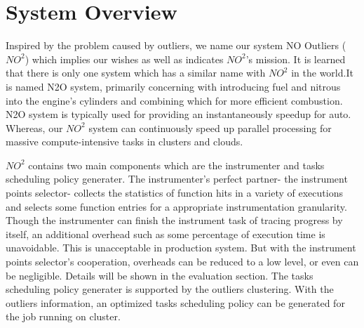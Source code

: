\section{System Overview} \label{sec-overview}

Inspired by the problem caused by outliers, we name our system NO Outliers ($NO^2$) which implies our
wishes as well as indicates $NO^2$'s mission. It is learned that there is only one system which has a
similar name with $NO^2$ in the world.It is named N2O system, primarily concerning with
introducing fuel and nitrous into the engine's cylinders and combining which for more
efficient combustion. N2O system is typically used for providing an instantaneously speedup for auto.
Whereas, our $NO^2$ system can continuously speed up parallel processing for massive
compute-intensive tasks in clusters and clouds.

$NO^2$ contains two main components which are the instrumenter and tasks scheduling policy
generater. The instrumenter's perfect partner- the instrument points selector- 
collects the statistics of function hits in a variety of executions and selects some
function entries for a appropriate instrumentation granularity. Though the instrumenter
can finish the instrument task of tracing progress by itself, an additional overhead such
as some percentage of execution time is unavoidable. This is unacceptable in
production system. But with the instrument points selector's cooperation, overheads can be
reduced to a low level, or even can be negligible. Details will be shown in the evaluation section. The
tasks scheduling policy generater is supported by the outliers clustering. With the
outliers information, an optimized tasks scheduling policy can be generated for the job
running on cluster.

